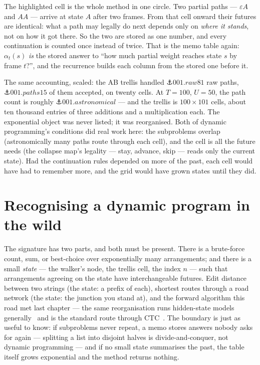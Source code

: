 \begin{narrative}
The highlighted cell is the whole method in one circle. Two partial
paths — $\varepsilon A$ and $AA$ — arrive at state $A$ after two
frames. From that cell onward their futures are identical: what a path
may legally do next depends only on \emph{where it stands}, not on how
it got there. So the two are stored as one number, and every
continuation is counted once instead of twice. That is the memo table
again: $\alpha_t(s)$ \emph{is} the stored answer to ``how much partial
weight reaches state $s$ by frame $t$?'', and the recurrence builds
each column from the stored one before it.

The same accounting, scaled: the AB trellis handled
$\anchor{001.raw81}$ raw paths, $\anchor{001.paths15}$ of them
accepted, on twenty cells. At $T = 100$, $U = 50$, the path count is
roughly $\anchor{001.astronomical}$ — and the trellis is
$100 \times 101$ cells, about ten thousand entries of three additions
and a multiplication each. The exponential object was never listed;
it was reorganised. Both of dynamic programming's conditions did real
work here: the subproblems overlap (astronomically many paths route
through each cell), and the cell is all the future needs (the collapse
map's legality — stay, advance, skip — reads only the current state).
Had the continuation rules depended on more of the past, each cell
would have had to remember more, and the grid would have grown states
until they did.

\section{Recognising a dynamic program in the wild}

The signature has two parts, and both must be present. There is a
brute-force count, sum, or best-choice over exponentially many
arrangements; and there is a small \emph{state} — the walker's node,
the trellis cell, the index $n$ — such that arrangements agreeing on
the state have interchangeable futures. Edit distance between two
strings (the state: a prefix of each), shortest routes through a road
network (the state: the junction you stand at), and the forward
algorithm this road met last chapter — the same reorganisation
runs hidden-state models generally~\cite{deep_learning-lawrence-r-rabiner-the-hmm-tutorial-proc-ieee-1989}
and is the standard route through
CTC~\cite{deep_learning-hannun-sequence-modeling-with-ctc-distill-2017}.
The boundary is just as useful to know: if subproblems never repeat,
a memo stores answers nobody asks for again — splitting a list into
disjoint halves is divide-and-conquer, not dynamic programming — and
if no small state summarises the past, the table itself grows
exponential and the method returns nothing.


\end{narrative}
